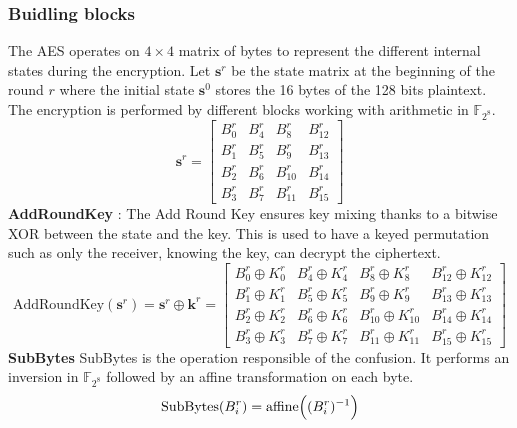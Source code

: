 \subsubsection{Buidling blocks}
The AES operates on $4\times4$ matrix of bytes to represent the different 
internal states during the encryption. Let $\mathbf{s}^r$ be the state 
matrix at the beginning of the round $r$ where the initial state 
$\mathbf{s}^0$ stores the 16 bytes of the 128 bits plaintext. The 
encryption is performed by different blocks working with arithmetic in 
$\mathbb{F}_{2^8}$.
\begin{equation*}
    \mathbf{s}^r = \begin{bmatrix}
B_0^r & B_4^r & B_8^r    & B_{12}^r\\
B_1^r & B_5^r & B_9^r    & B_{13}^r\\
B_2^r & B_6^r & B_{10}^r & B_{14}^r\\
B_3^r & B_7^r & B_{11}^r & B_{15}^r
\end{bmatrix}
\end{equation*}
\textbf{AddRoundKey} : The Add Round Key ensures key mixing thanks to a 
bitwise XOR between the state and the key. This is used to have a keyed 
permutation such as only the receiver, knowing the key, can decrypt the 
ciphertext.
\begin{equation*}
    \text{AddRoundKey}(\mathbf{s}^r) = \mathbf{s}^r \oplus \mathbf{k}^r = 
\begin{bmatrix}
B_0^r\oplus K_0^r & B_4^r\oplus K_4^r & B_8^r   \oplus K_{8}^r  & 
B_{12}^r\oplus K_{12}^r\\
B_1^r\oplus K_1^r & B_5^r\oplus K_5^r & B_9^r   \oplus K_{9}^r  & 
B_{13}^r\oplus K_{13}^r\\
B_2^r\oplus K_2^r & B_6^r\oplus K_6^r & B_{10}^r\oplus K_{10}^r & 
B_{14}^r\oplus K_{14}^r\\
B_3^r\oplus K_3^r & B_7^r\oplus K_7^r & B_{11}^r\oplus K_{11}^r & 
B_{15}^r\oplus K_{15}^r
\end{bmatrix}
\end{equation*}
\textbf{SubBytes} SubBytes is the operation responsible of the confusion. 
It performs an inversion in $\mathbb{F}_{2^8}$ followed by an affine 
transformation on each byte. 
\begin{equation*}
     \text{SubBytes}(B^r_i) = \text{affine}\Bigl((B_i^r)^{-1}\Bigr)
\end{equation*}
